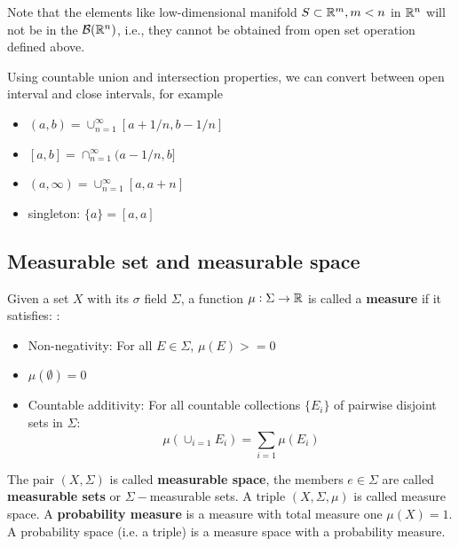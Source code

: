 \begin{refsection}
\begin{remark}
Note that the elements like low-dimensional manifold $S\subset \mathbb{R}^m, m<n$ in $\mathbb{R}^n$ will not be in the $\mathcal{B}(\mathbb{R}^n)$, i.e., they cannot be obtained from open set operation defined above. 
\end{remark}


\begin{note}
Using countable union and intersection properties, we can convert between open interval and close intervals, for example
\begin{itemize}
	\item $(a,b)=\cup_{n=1}^{\infty}[a+1/n,b-1/n]$
	\item $[a,b]=\cap_{n=1}^{\infty}(a-1/n,b]$
	\item $(a,\infty) = \cup_{n=1}^{\infty}[a,a+n]$
	\item singleton: $\{a\} = [a,a]$
\end{itemize}	
\end{note}



\subsection{Measurable set and measurable space}


\begin{definition}
Given a set $X$ with its $\sigma$ field $\Sigma$, a function $\mu: \Sigma \rightarrow \mathbb{R}$ is called a \textbf{measure} if it satisfies: \cite{wiki:measure}:
\begin{itemize}
    \item Non-negativity: For all $E \in \Sigma$, $\mu(E)>=0$
    \item $\mu(\emptyset) = 0$
    \item Countable additivity: For all countable collections $\{E_i\}$ of pairwise disjoint sets in $\Sigma$:
    $$\mu(\cup_{i=1} E_i) = \sum_{i=1} \mu(E_i)$$
\end{itemize}

The pair $(X,\Sigma)$ is called \textbf{measurable space}, the members  $e\in \Sigma$ are called \textbf{measurable sets} or $\Sigma-$measurable sets. A triple $(X,\Sigma,\mu)$ is called measure space. A \textbf{probability measure} is a measure with total measure one $\mu(X) = 1$. A probability space (i.e. a triple) is a measure space with a probability measure.\cite{dineen2013probability}
\end{definition}


\end{refsection}
